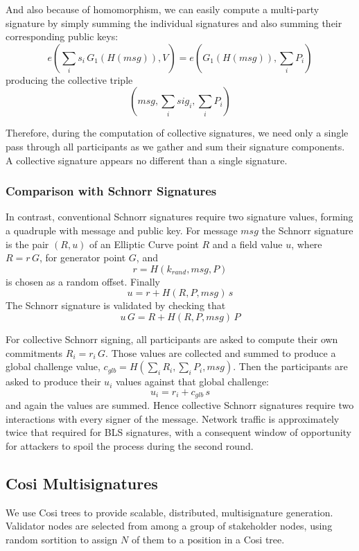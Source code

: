 \documentclass{yellowpaper}
\begin{document}
And also because of homomorphism, we can easily compute a multi-party signature by simply summing the individual signatures and also summing their corresponding public keys: 
$$e({\sum_i s_i} \, G_1(H(msg)),V) = e(G_1(H(msg)), {\sum_i P_i})$$
producing the collective triple 
$$(msg, {\sum_i sig_i}, {\sum_i P_i})$$

Therefore, during the computation of collective signatures, we need only a single pass through all participants as we gather and sum their signature components. A collective signature appears no different than a single signature.\\

\subsubsection{Comparison with Schnorr Signatures}
In contrast, conventional Schnorr signatures require two signature values, forming a quadruple with message and public key. For message $msg$ the Schnorr signature is the pair $(R,u)$ of an Elliptic Curve point $R$ and a field value $u$, where $R = r \, G$, for generator point $G$, and 
$$r = H(k_{rand}, msg, P)$$ 
is chosen as a random offset. Finally 
$$u = r + H(R,P,msg)\, s$$ 
The Schnorr signature is validated by checking that 
$$u\, G = R + H(R, P, msg)\, P$$

For collective Schnorr signing, all participants are asked to compute their own commitments $R_i = r_i\, G$. Those values are collected and summed to produce a global challenge value, $c_{glb} = H(\sum_i R_i, \sum_i P_i, msg)$.  Then the participants are asked to produce their $u_i$ values against that global challenge:
$$u_i = r_i + c_{glb} \, s$$
and again the values are summed. Hence collective Schnorr signatures require two interactions with every signer of the message. Network traffic is approximately twice that required for BLS signatures, with a consequent window of opportunity for attackers to spoil the process during the second round.
\subsection{Cosi Multisignatures}
We use Cosi trees\cite{cosi} to provide scalable, distributed, multisignature generation. Validator nodes are selected from among a group of stakeholder nodes, using random sortition to assign $N$ of them to a position in a Cosi tree. 
\end{document}
